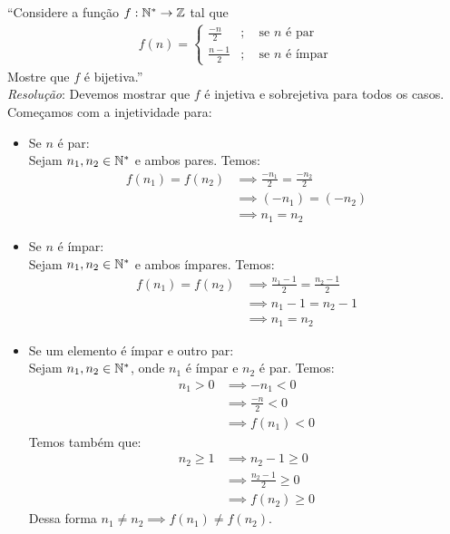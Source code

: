 \enquote{Considere a função $f: \mathbb N^* \rightarrow \mathbb Z$ tal que
\begin{align*}
f(n) = \left\{
        \begin{aligned}
            \frac{-n}{2} &; \quad \text{se $n$ é par} \\
            \frac{n - 1}{2} &; \quad \text{se $n$ é ímpar}
        \end{aligned}
        \right.
\end{align*}
Mostre que $f$ é bijetiva.} \\
\emph{Resolução}: Devemos mostrar que $f$ é injetiva e sobrejetiva para todos os casos. Começamos com a injetividade para:
\begin{itemize}
    \item Se $n$ é par: \\
    Sejam $n_1, n_2 \in \mathbb N^*$ e ambos pares. Temos:
    \begin{align*}
        f(n_1) = f(n_2) &\implies \frac{-n_1}{2} = \frac{-n_2}{2} \\ &\implies
        (-n_1) = (-n_2) \\ &\implies
        n_1 = n_2
    \end{align*}
    \item Se $n$ é ímpar: \\
    Sejam $n_1, n_2 \in \mathbb N^*$ e ambos ímpares. Temos:
    \begin{align*}
        f(n_1) = f(n_2) &\implies \frac{n_1 - 1}{2} = \frac{n_2 - 1}{2} \\ &\implies
        n_1 - 1 = n_2 - 1 \\ &\implies 
        n_1 = n_2
    \end{align*}
    \item Se um elemento é ímpar e outro par: \\
    Sejam $n_1, n_2 \in \mathbb N^*$, onde $n_1$ é ímpar e $n_2$ é par. Temos:
    \begin{align*}
        n_1 > 0 & \implies -n_1 < 0 \\ & \implies
        \frac{-n}{2} < 0 \\ & \implies
        f(n_1) < 0
    \end{align*}
    Temos também que:
    \begin{align*}
        n_2 \ge 1 & \implies n_2 - 1 \ge 0 \\ & \implies
        \frac{n_2 - 1}{2} \ge 0 \\ & \implies
        f(n_2) \ge 0
    \end{align*}
    Dessa forma $n_1 \ne n_2 \implies f(n_1) \ne f(n_2)$.
\end{itemize}
